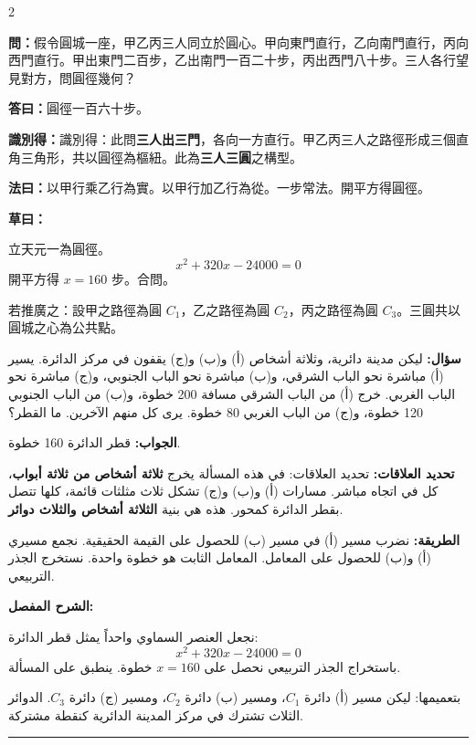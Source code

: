\documentclass[11pt,a4paper]{article}
\newcommand{\ar}[1]{\arabicfont\beginR #1\endR}
\newcommand{\arb}[1]{\textbf{\arabicfont\beginR #1\endR}}
\newcommand{\longline}{\noindent\rule{\textwidth}{0.4pt}}
\newcommand{\arnote}[1]{\textcolor{arabicblue}{\ar{#1}}}
\newcommand{\wen}[1]{\par\noindent\textbf{\textcolor{probcolor}{問：}}{#1}\par}
\newcommand{\da}[1]{\par\noindent\textbf{\textcolor{anscolor}{答曰：}}{#1}\par}
\newcommand{\fayue}[1]{\par\noindent\textbf{\textcolor{methodcolor}{法曰：}}{#1}\par}
\newcommand{\caoyue}[1]{\par\noindent\textbf{草曰：}{#1}\par}
\newcommand{\zhi}[1]{\par\noindent\textbf{識別得：}{#1}\par}
\newcommand{\arwen}[1]{\par\noindent\arb{سؤال: }\arnote{#1}\par}
\newcommand{\arjwb}[1]{\par\noindent\arb{الجواب: }\arnote{#1}\par}
\newcommand{\arqwd}[1]{\par\noindent\arb{الطريقة: }\arnote{#1}\par}
\newcommand{\arshr}[1]{\par\noindent\arb{الشرح المفصل: }\arnote{#1}\par}
\newcommand{\arfl}[1]{\par\noindent\arb{تحديد العلاقات: }\arnote{#1}\par}
\begin{document}
\begin{paracol}{2}

\begin{leftcolumn}
\wen{假令圓城一座，甲乙丙三人同立於圓心。甲向東門直行，乙向南門直行，丙向西門直行。甲出東門二百步，乙出南門一百二十步，丙出西門八十步。三人各行望見對方，問圓徑幾何？}

\da{圓徑一百六十步。}

\zhi{識別得：此問\textbf{三人出三門}，各向一方直行。甲乙丙三人之路徑形成三個直角三角形，共以圓徑為樞紐。此為\textbf{三人三圓}之構型。}

\fayue{以甲行乘乙行為實。以甲行加乙行為從。一步常法。開平方得圓徑。}

\caoyue{
立天元一為圓徑。
$$x^2 + 320x - 24000 = 0$$
開平方得 $x = 160$ 步。合問。

若推廣之：設甲之路徑為圓 $C_1$，乙之路徑為圓 $C_2$，丙之路徑為圓 $C_3$。三圓共以圓城之心為公共點。}
\end{leftcolumn}

\begin{rightcolumn}
\arwen{ليكن مدينة دائرية، وثلاثة أشخاص (أ) و(ب) و(ج) يقفون في مركز الدائرة. يسير (أ) مباشرة نحو الباب الشرقي، و(ب) مباشرة نحو الباب الجنوبي، و(ج) مباشرة نحو الباب الغربي. خرج (أ) من الباب الشرقي مسافة 200 خطوة، و(ب) من الباب الجنوبي 120 خطوة، و(ج) من الباب الغربي 80 خطوة. يرى كل منهم الآخرين. ما القطر؟}

\arjwb{قطر الدائرة 160 خطوة.}

\arfl{تحديد العلاقات: في هذه المسألة يخرج \textbf{ثلاثة أشخاص من ثلاثة أبواب}، كل في اتجاه مباشر. مسارات (أ) و(ب) و(ج) تشكل ثلاث مثلثات قائمة، كلها تتصل بقطر الدائرة كمحور. هذه هي بنية \textbf{الثلاثة أشخاص والثلاث دوائر}.}

\arqwd{نضرب مسير (أ) في مسير (ب) للحصول على القيمة الحقيقية. نجمع مسيري (أ) و(ب) للحصول على المعامل. المعامل الثابت هو خطوة واحدة. نستخرج الجذر التربيعي.}

\arshr{نجعل العنصر السماوي واحداً يمثل قطر الدائرة:
$$x^2 + 320x - 24000 = 0$$
باستخراج الجذر التربيعي نحصل على $x = 160$ خطوة. ينطبق على المسألة.

بتعميمها: ليكن مسير (أ) دائرة $C_1$، ومسير (ب) دائرة $C_2$، ومسير (ج) دائرة $C_3$. الدوائر الثلاث تشترك في مركز المدينة الدائرية كنقطة مشتركة.}
\end{rightcolumn}

\end{paracol}

\vspace{0.3cm}
\longline
\end{document}
